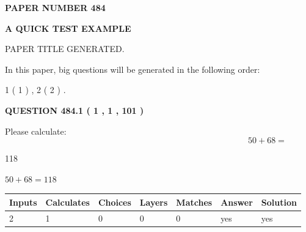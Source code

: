 \documentclass[12pt]{article}
\begin{document}
   
   
   
 {\textbf{ \Large{ PAPER NUMBER  484  }}}
   
   
\vspace{0.2in}
   
   
   
   
   
   
   
   
 \vspace{0.2in}
{\LARGE {\textbf{ A QUICK TEST EXAMPLE}}}
   
   
 PAPER TITLE GENERATED.
   
   
   
\vspace{0.2in}
   
In this paper, big questions will be generated in the following order: 
   
   
   1 ( 1 )
 ,
   2 ( 2 )
 .
  
\vspace{0.2in}
  
{\textbf{\Large{QUESTION
484.1 
 ( 1 , 1 , 101 )
}}}
  
  
 
Please calculate:
\begin{equation}
50 +  %
68 = \nonumber
\end{equation}
 
 
 
\noindent{}
 
 

118
 
 
\noindent{}
 
 

 
 
 
\noindent{}
 
 

$ %
50 +  %
68=   %
118$
 
 
\noindent{}
 
 

 
   
   
   
   
\noindent\begin{tabular}{|l|l|l|l|l|l|l|}
 \hline
Inputs & Calculates & Choices & Layers & Matches & Answer & Solution \\ \hline
 2  & 
 1  & 
 0
  & 
 0  & 
 0  & 
  yes & 
  yes 
  \\ \hline
 \end{tabular}
   
\end{document}
